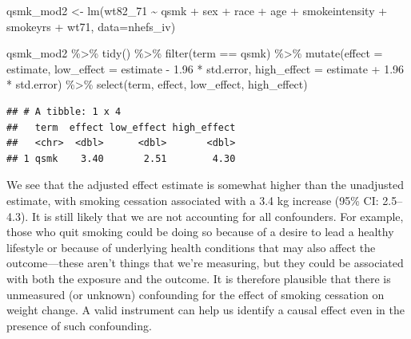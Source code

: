 \documentclass[
]{book}
\newenvironment{Shaded}{\begin{snugshade}}{\end{snugshade}}
\newcommand{\AttributeTok}[1]{\textcolor[rgb]{0.77,0.63,0.00}{#1}}
\newcommand{\FloatTok}[1]{\textcolor[rgb]{0.00,0.00,0.81}{#1}}
\newcommand{\FunctionTok}[1]{\textcolor[rgb]{0.00,0.00,0.00}{#1}}
\newcommand{\NormalTok}[1]{#1}
\newcommand{\OtherTok}[1]{\textcolor[rgb]{0.56,0.35,0.01}{#1}}
\newcommand{\SpecialCharTok}[1]{\textcolor[rgb]{0.00,0.00,0.00}{#1}}
\newcommand{\StringTok}[1]{\textcolor[rgb]{0.31,0.60,0.02}{#1}}
\begin{document}
\begin{Shaded}
\begin{Highlighting}[]
\NormalTok{qsmk\_mod2 }\OtherTok{\textless{}{-}} \FunctionTok{lm}\NormalTok{(wt82\_71 }\SpecialCharTok{\textasciitilde{}}\NormalTok{ qsmk }\SpecialCharTok{+}\NormalTok{ sex }\SpecialCharTok{+}\NormalTok{ race }\SpecialCharTok{+}\NormalTok{ age }\SpecialCharTok{+} 
\NormalTok{                  smokeintensity }\SpecialCharTok{+}\NormalTok{ smokeyrs }\SpecialCharTok{+}\NormalTok{ wt71, }
                \AttributeTok{data=}\NormalTok{nhefs\_iv)}

\NormalTok{qsmk\_mod2 }\SpecialCharTok{\%\textgreater{}\%} 
  \FunctionTok{tidy}\NormalTok{() }\SpecialCharTok{\%\textgreater{}\%} 
  \FunctionTok{filter}\NormalTok{(term }\SpecialCharTok{==} \StringTok{\textquotesingle{}qsmk\textquotesingle{}}\NormalTok{) }\SpecialCharTok{\%\textgreater{}\%}
  \FunctionTok{mutate}\NormalTok{(}\AttributeTok{effect =}\NormalTok{ estimate,}
         \AttributeTok{low\_effect =}\NormalTok{ estimate }\SpecialCharTok{{-}} \FloatTok{1.96} \SpecialCharTok{*}\NormalTok{ std.error, }
         \AttributeTok{high\_effect =}\NormalTok{ estimate }\SpecialCharTok{+} \FloatTok{1.96} \SpecialCharTok{*}\NormalTok{ std.error) }\SpecialCharTok{\%\textgreater{}\%} 
  \FunctionTok{select}\NormalTok{(term, effect, low\_effect, high\_effect)}
\end{Highlighting}
\end{Shaded}

\begin{verbatim}
## # A tibble: 1 x 4
##   term  effect low_effect high_effect
##   <chr>  <dbl>      <dbl>       <dbl>
## 1 qsmk    3.40       2.51        4.30
\end{verbatim}

We see that the adjusted effect estimate is somewhat higher than the unadjusted estimate, with smoking cessation associated with a 3.4 kg increase (95\% CI: 2.5--4.3). It is still likely that we are not accounting for all confounders. For example, those who quit smoking could be doing so because of a desire to lead a healthy lifestyle or because of underlying health conditions that may also affect the outcome---these aren't things that we're measuring, but they could be associated with both the exposure and the outcome. It is therefore plausible that there is unmeasured (or unknown) confounding for the effect of smoking cessation on weight change. A valid instrument can help us identify a causal effect even in the presence of such confounding.
\end{document}
